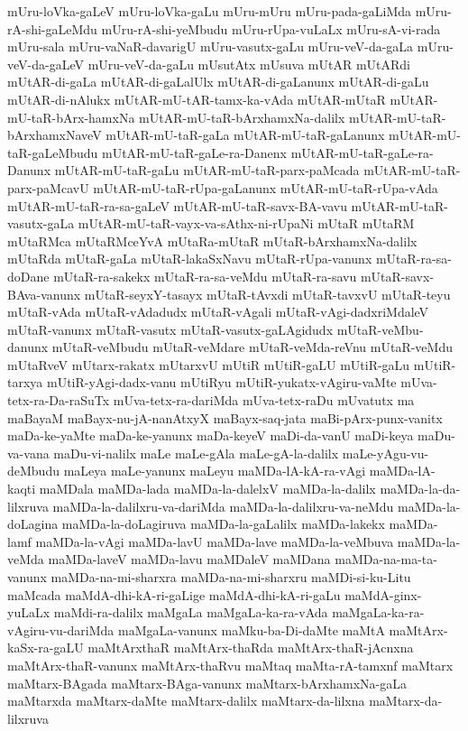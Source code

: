 {mUru-loVka-gaLeV
mUru-loVka-gaLu
mUru-mUru
mUru-pada-gaLiMda
mUru-rA-shi-gaLeMdu
mUru-rA-shi-yeMbudu
mUru-rUpa-vuLaLx
mUru-sA-vi-rada
mUru-sala
mUru-vaNaR-davarigU
mUru-vasutx-gaLu
mUru-veV-da-gaLa
mUru-veV-da-gaLeV
mUru-veV-da-gaLu
mUsutAtx
mUsuva
mUtAR
mUtARdi
mUtAR-di-gaLa
mUtAR-di-gaLalUlx
mUtAR-di-gaLanunx
mUtAR-di-gaLu
mUtAR-di-nAlukx
mUtAR-mU-tAR-tamx-ka-vAda
mUtAR-mUtaR
mUtAR-mU-taR-bArx-hamxNa
mUtAR-mU-taR-bArxhamxNa-dalilx
mUtAR-mU-taR-bArxhamxNaveV
mUtAR-mU-taR-gaLa
mUtAR-mU-taR-gaLanunx
mUtAR-mU-taR-gaLeMbudu
mUtAR-mU-taR-gaLe-ra-Danenx
mUtAR-mU-taR-gaLe-ra-Danunx
mUtAR-mU-taR-gaLu
mUtAR-mU-taR-parx-paMcada
mUtAR-mU-taR-parx-paMcavU
mUtAR-mU-taR-rUpa-gaLanunx
mUtAR-mU-taR-rUpa-vAda
mUtAR-mU-taR-ra-sa-gaLeV
mUtAR-mU-taR-savx-BA-vavu
mUtAR-mU-taR-vasutx-gaLa
mUtAR-mU-taR-vayx-va-sAthx-ni-rUpaNi
mUtaR
mUtaRM
mUtaRMca
mUtaRMceYvA
mUtaRa-mUtaR
mUtaR-bArxhamxNa-dalilx
mUtaRda
mUtaR-gaLa
mUtaR-lakaSxNavu
mUtaR-rUpa-vanunx
mUtaR-ra-sa-doDane
mUtaR-ra-sakekx
mUtaR-ra-sa-veMdu
mUtaR-ra-savu
mUtaR-savx-BAva-vanunx
mUtaR-seyxY-tasayx
mUtaR-tAvxdi
mUtaR-tavxvU
mUtaR-teyu
mUtaR-vAda
mUtaR-vAdadudx
mUtaR-vAgali
mUtaR-vAgi-dadxriMdaleV
mUtaR-vanunx
mUtaR-vasutx
mUtaR-vasutx-gaLAgidudx
mUtaR-veMbu-danunx
mUtaR-veMbudu
mUtaR-veMdare
mUtaR-veMda-reVnu
mUtaR-veMdu
mUtaRveV
mUtarx-rakatx
mUtarxvU
mUtiR
mUtiR-gaLU
mUtiR-gaLu
mUtiR-tarxya
mUtiR-yAgi-dadx-vanu
mUtiRyu
mUtiR-yukatx-vAgiru-vaMte
mUva-tetx-ra-Da-raSuTx
mUva-tetx-ra-dariMda
mUva-tetx-raDu
mUvatutx
ma
maBayaM
maBayx-nu-jA-nanAtxyX
maBayx-saq-jata
maBi-pArx-punx-vanitx
maDa-ke-yaMte
maDa-ke-yanunx
maDa-keyeV
maDi-da-vanU
maDi-keya
maDu-va-vana
maDu-vi-nalilx
maLe
maLe-gAla
maLe-gA-la-dalilx
maLe-yAgu-vu-deMbudu
maLeya
maLe-yanunx
maLeyu
maMDa-lA-kA-ra-vAgi
maMDa-lA-kaqti
maMDala
maMDa-lada
maMDa-la-dalelxV
maMDa-la-dalilx
maMDa-la-da-lilxruva
maMDa-la-dalilxru-va-dariMda
maMDa-la-dalilxru-va-neMdu
maMDa-la-doLagina
maMDa-la-doLagiruva
maMDa-la-gaLalilx
maMDa-lakekx
maMDa-lamf
maMDa-la-vAgi
maMDa-lavU
maMDa-lave
maMDa-la-veMbuva
maMDa-la-veMda
maMDa-laveV
maMDa-lavu
maMDaleV
maMDana
maMDa-na-ma-ta-vanunx
maMDa-na-mi-sharxra
maMDa-na-mi-sharxru
maMDi-si-ku-Litu
maMcada
maMdA-dhi-kA-ri-gaLige
maMdA-dhi-kA-ri-gaLu
maMdA-ginx-yuLaLx
maMdi-ra-dalilx
maMgaLa
maMgaLa-ka-ra-vAda
maMgaLa-ka-ra-vAgiru-vu-dariMda
maMgaLa-vanunx
maMku-ba-Di-daMte
maMtA
maMtArx-kaSx-ra-gaLU
maMtArxthaR
maMtArx-thaRda
maMtArx-thaR-jAcnxna
maMtArx-thaR-vanunx
maMtArx-thaRvu
maMtaq
maMta-rA-tamxnf
maMtarx
maMtarx-BAgada
maMtarx-BAga-vanunx
maMtarx-bArxhamxNa-gaLa
maMtarxda
maMtarx-daMte
maMtarx-dalilx
maMtarx-da-lilxna
maMtarx-da-lilxruva
}
